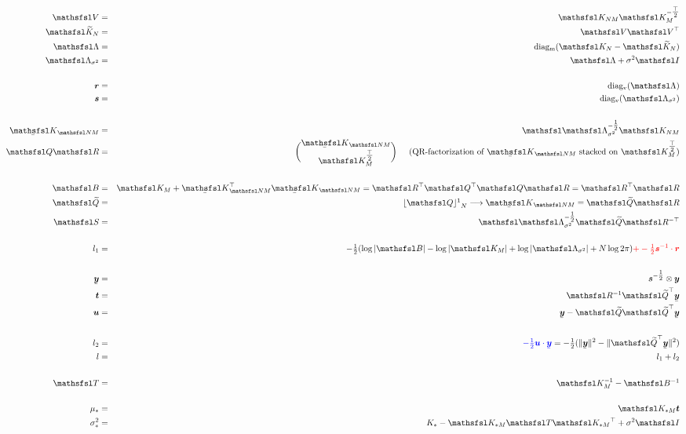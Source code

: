 \documentclass[10pt]{report}
\begin{document}
\begin{eqnarray*}
\matV & = & \Knm\icholt{K_M} \\
\mat{\widetilde{K}_N} & = & \matV \transm{V} \\
\Lam & = & \diagm{\mat{K_N} - \mat{\widetilde{K}_N}} \\
\Lamss & = & \Lam + \sigma^2 \matI \\
\\
\vecr & = & \diagv{\Lam} \\
\vecs & = & \diagv{\Lamss} \\
\\
\uKnm & = & \ichol{\Lamss} \Knm \\
\matQ \matR & = & {\uKnm\choose\cholt{K_M}} \hspace{5mm}
\textrm{(QR-factorization of $\uKnm$ stacked on $\cholt{K_M}$)} \\
\\
\matB & = & \Km + \uKmn\uKnm = \transm{R}\transm{Q} \mat{Q} \matR = \transm{R}\matR \\
\matQn & = & {\lfloor \matQ \rfloor\footnotemark}_{N} \longrightarrow \uKnm = \matQn \matR \\
\matS & = & \ichol{\Lamss}\matQn\itransm{R} \\
\\
l_1 & = & -\onehalf (\log|\matB| - \log|\Km| + \log|\Lamss| + N \log 2\pi) \red{+ -\onehalf\vecis \cdot \vecr} \\
\\
\uvecy & = & \veciss \otimes \vecy \\
\vect & = & \imat{R} \tmatQn \uvecy \\
\vecu & = & \uvecy - \matQn \tmatQn \uvecy \\
\\
l_2 & = & \blue{-\onehalf \vecu\cdot\uvecy} = -\onehalf(\|\uvecy\|^2 - \|\tmatQn \uvecy\|^2) \\
l & = & l_1 + l_2 \\
\\
\matT & = & \imat{K_M} - \imat{B} \\
\\
\mu_* & = & \mat{K_{*M}} \vect \\
\sigma^2_* & = & K_* - \mat{K_{*M}}\matT\transm{K_{*M}} + \sigma^2 \matI \\
\end{eqnarray*}
\end{document}
